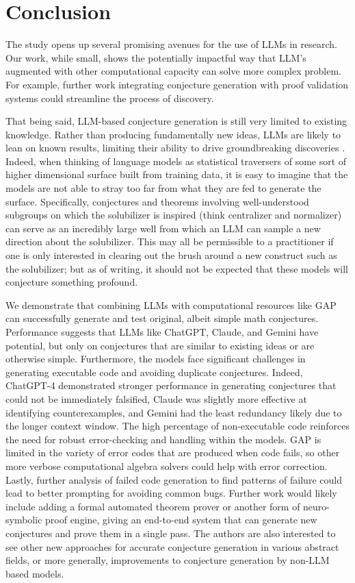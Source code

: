 \documentclass{article}
\begin{document}
\section{Conclusion}
The study opens up several promising avenues for the use of LLMs in research. Our work, while small, shows the potentially impactful way that LLM's augmented with other computational capacity can solve more complex problem. For example, further work integrating conjecture generation with proof validation systems could streamline the process of discovery. 

That being said, LLM-based conjecture generation is still very limited to existing knowledge. Rather than producing fundamentally new ideas, LLMs are likely to lean on known results, limiting their ability to drive groundbreaking discoveries \cite{mirzadeh2024gsmsymbolicunderstandinglimitationsmathematical}. Indeed, when thinking of language models as statistical traversers of some sort of higher dimensional surface built from training data, it is easy to imagine that the models are not able to stray too far from what they are fed to generate the surface. Specifically, conjectures and theorems involving well-understood subgroups on which the solubilizer is inspired (think centralizer and normalizer) can serve as an incredibly large well from which an LLM can sample a new direction about the solubilizer. This may all be permissible to a practitioner if one is only interested in clearing out the brush around a new construct such as the solubilizer; but as of writing, it should not be expected that these models will conjecture something profound. 

We demonstrate that combining LLMs with computational resources like GAP can successfully generate and test original, albeit simple math conjectures. Performance suggests that LLMs like ChatGPT, Claude, and Gemini have potential, but only on conjectures that are similar to existing ideas or are otherwise simple. Furthermore, the models face significant challenges in generating executable code and avoiding duplicate conjectures. Indeed, ChatGPT-4 demonstrated stronger performance in generating conjectures that could not be immediately falsified, Claude was slightly more effective at identifying counterexamples, and Gemini had the least redundancy likely due to the longer context window. The high percentage of non-executable code reinforces the need for robust error-checking and handling within the models. GAP is limited in the variety of error codes that are produced when code fails, so other more verbose computational algebra solvers could help with error correction. Lastly, further analysis of failed code generation to find patterns of failure could lead to better prompting for avoiding common bugs. Further work would likely include adding a formal automated theorem prover or another form of neuro-symbolic proof engine, giving an end-to-end system that can generate new conjectures and prove them in a single pass\cite{trinh2024solving, deepmind_imo_2023}. The authors are also interested to see other new approaches for accurate conjecture generation in various abstract fields, or more generally, improvements to conjecture generation by non-LLM based models.  
\pagebreak
\end{document}
